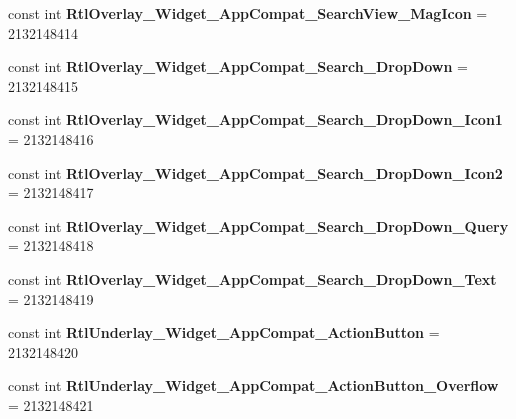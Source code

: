 \begin{DoxyCompactItemize}
const int {\bfseries Rtl\+Overlay\+\_\+\+Widget\+\_\+\+App\+Compat\+\_\+\+Search\+View\+\_\+\+Mag\+Icon} = 2132148414
\item 
\mbox{\label{classst_delivery_1_1_resource_1_1_style_ab9a7a917efa159dedba003f2f76bcdc5}} 
const int {\bfseries Rtl\+Overlay\+\_\+\+Widget\+\_\+\+App\+Compat\+\_\+\+Search\+\_\+\+Drop\+Down} = 2132148415
\item 
\mbox{\label{classst_delivery_1_1_resource_1_1_style_a875105943383b575e3773c2049137719}} 
const int {\bfseries Rtl\+Overlay\+\_\+\+Widget\+\_\+\+App\+Compat\+\_\+\+Search\+\_\+\+Drop\+Down\+\_\+\+Icon1} = 2132148416
\item 
\mbox{\label{classst_delivery_1_1_resource_1_1_style_a821c2357271459a844c8a8b909fe99a2}} 
const int {\bfseries Rtl\+Overlay\+\_\+\+Widget\+\_\+\+App\+Compat\+\_\+\+Search\+\_\+\+Drop\+Down\+\_\+\+Icon2} = 2132148417
\item 
\mbox{\label{classst_delivery_1_1_resource_1_1_style_a3077be0bc5d327cf1ad5407aceb198d1}} 
const int {\bfseries Rtl\+Overlay\+\_\+\+Widget\+\_\+\+App\+Compat\+\_\+\+Search\+\_\+\+Drop\+Down\+\_\+\+Query} = 2132148418
\item 
\mbox{\label{classst_delivery_1_1_resource_1_1_style_a9b69a6388867d089160cfa42d1798082}} 
const int {\bfseries Rtl\+Overlay\+\_\+\+Widget\+\_\+\+App\+Compat\+\_\+\+Search\+\_\+\+Drop\+Down\+\_\+\+Text} = 2132148419
\item 
\mbox{\label{classst_delivery_1_1_resource_1_1_style_a6153fe8485821519815fb1ff192362d0}} 
const int {\bfseries Rtl\+Underlay\+\_\+\+Widget\+\_\+\+App\+Compat\+\_\+\+Action\+Button} = 2132148420
\item 
\mbox{\label{classst_delivery_1_1_resource_1_1_style_ade7b2c0600611b701c9feb019b873d65}} 
const int {\bfseries Rtl\+Underlay\+\_\+\+Widget\+\_\+\+App\+Compat\+\_\+\+Action\+Button\+\_\+\+Overflow} = 2132148421
\item 
\mbox{\label{classst_delivery_1_1_resource_1_1_style_a72cd80acc133aa3242054264ad8e3c9b}} 

\end{DoxyCompactItemize}
